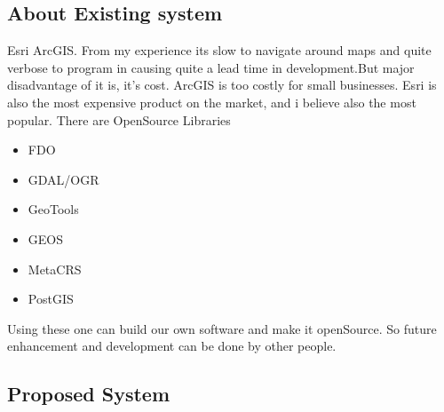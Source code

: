 \subsection{About Existing system}
Esri ArcGIS. From my experience its slow to navigate around maps and quite verbose to program in causing quite a lead time in development.But major disadvantage of it is, it's cost. ArcGIS is too costly for small businesses.
Esri is also the most expensive product on the market, and i believe also the most popular.
There are OpenSource Libraries
\begin{itemize}
\item FDO
\item GDAL/OGR
\item GeoTools
\item GEOS
\item MetaCRS
\item PostGIS
\end{itemize}
Using these one can build our own software and make it openSource. So future enhancement and development can be done by other people.


\subsection{Proposed System}
